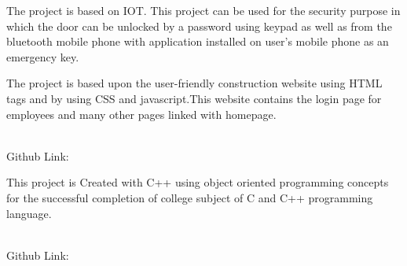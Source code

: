 \documentclass[]{vishal-kathpalia}
\begin{document}
\begin{minipage}[t]{0.66\textwidth}
\sectionsep
\datecolor{} 
\noindent
\hspace{0em}%
\begin{minipage}{0.95\textwidth\vspace{2pt}}
The project is based on IOT. This project can be used for the security purpose in which the door can be unlocked by a password using keypad as well as from the bluetooth mobile phone with application installed on user’s mobile phone as an emergency key. 
\end{minipage}
\sectionsep

\datecolor{} 
\noindent
\hspace{0em}%
\begin{minipage}{0.95\textwidth\vspace{2pt}}
The project is based upon the user-friendly construction website using HTML tags and by using CSS and javascript.This website contains the login page for employees and many other pages linked with homepage.
\end{minipage}
\\
Github Link: \href{https://github.com/Er-Vishal-Kathpalia/HTML_CSS}{}\\
\sectionsep

\datecolor{} 
\noindent
\hspace{0em}%
\begin{minipage}{0.95\textwidth\vspace{2pt}}
This project is Created with C++ using object oriented programming concepts for the successful completion of college subject of C and C++ programming language.
\end{minipage}
\\
Github Link: \href{https://github.com/Er-Vishal-Kathpalia/Library_Managment_System}{}


\end{minipage}
\end{document}
